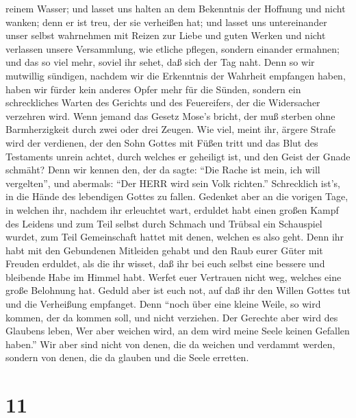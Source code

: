 reinem Wasser;  und lasset uns halten an dem Bekenntnis der
Hoffnung und nicht wanken; denn er ist treu, der sie verheißen hat;
 und lasset uns untereinander unser selbst wahrnehmen mit
Reizen zur Liebe und guten Werken  und nicht verlassen
unsere Versammlung, wie etliche pflegen, sondern einander ermahnen; und
das so viel mehr, soviel ihr sehet, daß sich der Tag naht. 
Denn so wir mutwillig sündigen, nachdem wir die Erkenntnis der Wahrheit
empfangen haben, haben wir fürder kein anderes Opfer mehr für die
Sünden,  sondern ein schreckliches Warten des Gerichts und
des Feuereifers, der die Widersacher verzehren wird.  Wenn
jemand das Gesetz Mose's bricht, der muß sterben ohne Barmherzigkeit
durch zwei oder drei Zeugen.  Wie viel, meint ihr, ärgere
Strafe wird der verdienen, der den Sohn Gottes mit Füßen tritt und das
Blut des Testaments unrein achtet, durch welches er geheiligt ist, und
den Geist der Gnade schmäht?  Denn wir kennen den, der da
sagte: ``Die Rache ist mein, ich will vergelten'', und abermals: ``Der
HERR wird sein Volk richten.''  Schrecklich ist's, in die
Hände des lebendigen Gottes zu fallen.  Gedenket aber an
die vorigen Tage, in welchen ihr, nachdem ihr erleuchtet wart, erduldet
habt einen großen Kampf des Leidens  und zum Teil selbst
durch Schmach und Trübsal ein Schauspiel wurdet, zum Teil Gemeinschaft
hattet mit denen, welchen es also geht.  Denn ihr habt mit
den Gebundenen Mitleiden gehabt und den Raub eurer Güter mit Freuden
erduldet, als die ihr wisset, daß ihr bei euch selbst eine bessere und
bleibende Habe im Himmel habt.  Werfet euer Vertrauen nicht
weg, welches eine große Belohnung hat.  Geduld aber ist
euch not, auf daß ihr den Willen Gottes tut und die Verheißung
empfanget.  Denn ``noch über eine kleine Weile, so wird
kommen, der da kommen soll, und nicht verziehen.  Der
Gerechte aber wird des Glaubens leben, Wer aber weichen wird, an dem
wird meine Seele keinen Gefallen haben.''  Wir aber sind
nicht von denen, die da weichen und verdammt werden, sondern von denen,
die da glauben und die Seele erretten.

\hypertarget{section-10}{%
\section{11}\label{section-10}}


